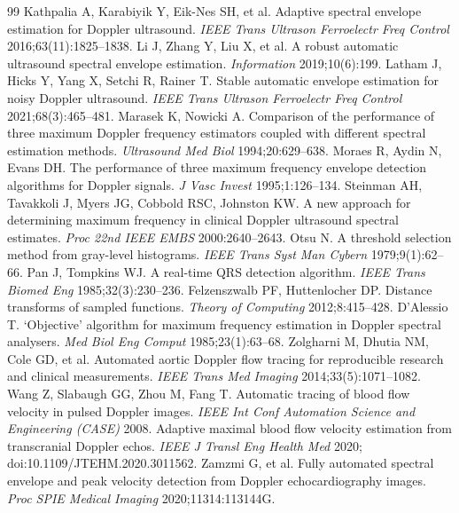 \documentclass[10pt,a4paper]{article}
\begin{document}
\begin{thebibliography}{99}\small
{} Kathpalia A, Karabiyik Y, Eik-Nes SH, et al. Adaptive spectral envelope estimation for Doppler ultrasound.
\emph{IEEE Trans Ultrason Ferroelectr Freq Control} 2016;63(11):1825--1838.
 Li J, Zhang Y, Liu X, et al. A robust automatic ultrasound spectral envelope estimation. \emph{Information} 2019;10(6):199.
 Latham J, Hicks Y, Yang X, Setchi R, Rainer T. Stable automatic envelope estimation for noisy Doppler ultrasound.
\emph{IEEE Trans Ultrason Ferroelectr Freq Control} 2021;68(3):465--481.
 Marasek K, Nowicki A. Comparison of the performance of three maximum Doppler frequency estimators coupled with
different spectral estimation methods. \emph{Ultrasound Med Biol} 1994;20:629--638.
 Moraes R, Aydin N, Evans DH. The performance of three maximum frequency envelope detection algorithms for Doppler
signals. \emph{J Vasc Invest} 1995;1:126--134.
 Steinman AH, Tavakkoli J, Myers JG, Cobbold RSC, Johnston KW. A new approach for determining maximum frequency in
clinical Doppler ultrasound spectral estimates. \emph{Proc 22nd IEEE EMBS} 2000:2640--2643.
 Otsu N. A threshold selection method from gray-level histograms. \emph{IEEE Trans Syst Man Cybern} 1979;9(1):62--66.
 Pan J, Tompkins WJ. A real-time QRS detection algorithm. \emph{IEEE Trans Biomed Eng} 1985;32(3):230--236.
 Felzenszwalb PF, Huttenlocher DP. Distance transforms of sampled functions. \emph{Theory of Computing} 2012;8:415--428.
 D'Alessio T. `Objective' algorithm for maximum frequency estimation in Doppler spectral analysers.
\emph{Med Biol Eng Comput} 1985;23(1):63--68.
 Zolgharni M, Dhutia NM, Cole GD, et al. Automated aortic Doppler flow tracing for reproducible research and clinical
measurements. \emph{IEEE Trans Med Imaging} 2014;33(5):1071--1082.
 Wang Z, Slabaugh GG, Zhou M, Fang T. Automatic tracing of blood flow velocity in pulsed Doppler images.
\emph{IEEE Int Conf Automation Science and Engineering (CASE)} 2008.
 Adaptive maximal blood flow velocity estimation from transcranial Doppler echos. \emph{IEEE J Transl Eng Health Med}
2020; doi:10.1109/JTEHM.2020.3011562.
 Zamzmi G, et al. Fully automated spectral envelope and peak velocity detection from Doppler echocardiography images.
\emph{Proc SPIE Medical Imaging} 2020;11314:113144G.

\end{thebibliography}
\end{document}
